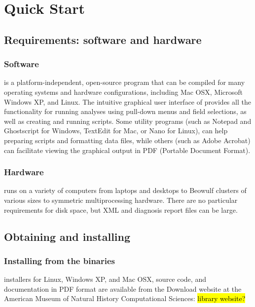 \chapter{\poy Quick Start}

\section{Requirements: software and hardware}

\subsection{Software}
\poy is a platform-independent, open-source program that can be compiled for many operating systems and hardware configurations, including Mac OSX, Microsoft Windows XP, and Linux. %
The intuitive graphical user interface of \poy provides all the functionality for running analyses using pull-down menus and field selections, as well as creating and running \poy scripts. Some utility programs (such as Notepad and Ghostscript for Windows, TextEdit for Mac, or Nano for Linux), can help preparing \poy scripts and formatting data files, while others (such as Adobe Acrobat) can facilitate viewing the graphical output in PDF (Portable Document Format).

\subsection{Hardware}
\poy runs on a variety of computers from laptops and desktops to Beowulf clusters 
of various sizes to symmetric multiprocessing hardware. There are no
particular requirements for disk space, but XML and diagnosis report files can be large.

\section{Obtaining and installing \poy}
\subsection{Installing from the binaries}
\poy installers for Linux, Windows XP, and Mac OSX, source code, and documentation in PDF format are available from the \poy Download website at the American Museum of Natural History Computational Sciences:
\hl{library website?}

